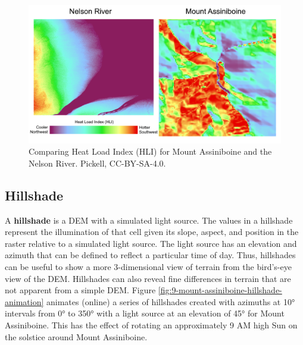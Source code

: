 \documentclass[
]{book}
\begin{document}
\begin{figure}
\includegraphics[width=0.75\linewidth]{images/09-mount-assiniboine-nelson-river-heat-load-index} \caption{Comparing Heat Load Index (HLI) for Mount Assiniboine and the Nelson River. Pickell, CC-BY-SA-4.0.}\label{fig:9-mount-assiniboine-nelson-river-heat-load-index}
\end{figure}

\hypertarget{hillshade}{%
\subsection{Hillshade}\label{hillshade}}

A \textbf{hillshade} is a DEM with a simulated light source. The values in a hillshade represent the illumination of that cell given its slope, aspect, and position in the raster relative to a simulated light source. The light source has an elevation and azimuth that can be defined to reflect a particular time of day. Thus, hillshades can be useful to show a more 3-dimensional view of terrain from the bird's-eye view of the DEM. Hillshades can also reveal fine differences in terrain that are not apparent from a simple DEM. Figure \ref{fig:9-mount-assiniboine-hillshade-animation} animates (online) a series of hillshades created with azimuths at 10° intervals from 0° to 350° with a light source at an elevation of 45° for Mount Assiniboine. This has the effect of rotating an approximately 9 AM high Sun on the solstice around Mount Assiniboine.
\end{document}
